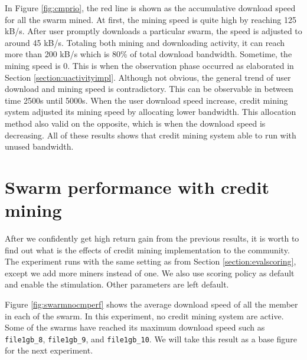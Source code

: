In Figure \ref{fig:cmprio}, the red line is shown as the accumulative download speed for all the swarm mined. At first, the mining speed is quite high by reaching 125 kB/s. After user promptly downloads a particular swarm, the speed is adjusted to around 45 kB/s. Totaling both mining and downloading activity, it can reach more than 200 kB/s which is 80\% of total download bandwidth. Sometime, the mining speed is 0. This is when the observation phase occurred as elaborated in Section \ref{section:uactivityimpl}. Although not obvious, the general trend of user download and mining speed is contradictory. This can be observable in between time 2500s until 5000s. When the user download speed increase, credit mining system adjusted its mining speed by allocating lower bandwidth. This allocation method also valid on the opposite, which is when the download speed is decreasing. All of these results shows that credit mining system able to run with unused bandwidth. 

\section{Swarm performance with credit mining}
\label{section:swperf}
After we confidently get high return gain from the previous results, it is worth to find out what is the effects of credit mining implementation to the community. The experiment runs with the same setting as from Section \ref{section:evalscoring}, except we add more miners instead of one. We also use scoring policy as default and enable the stimulation. Other parameters are left default. 

Figure \ref{fig:swarmnocmperf} shows the average download speed of all the member in each of the swarm. In this experiment, no credit mining system are active. Some of the swarms have reached its maximum download speed such as \texttt{file1gb\_8}, \texttt{file1gb\_9}, and \texttt{file1gb\_10}. We will take this result as a base figure for the next experiment.

